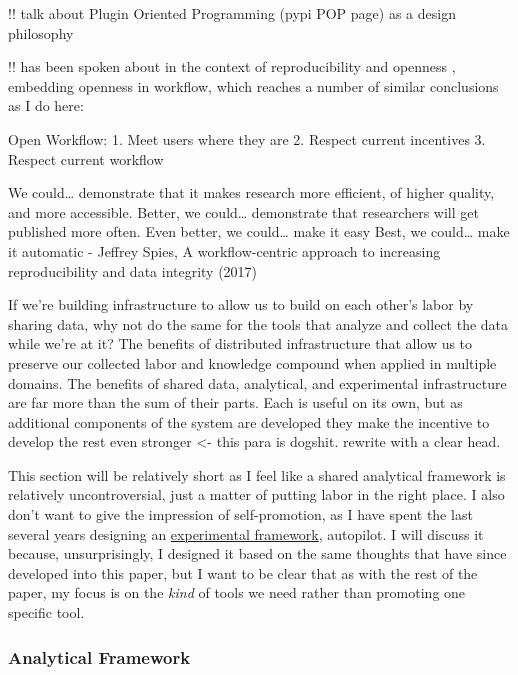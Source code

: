 \documentclass[10pt]{article}
\begin{document}
\begin{multicols}{2}
 !! talk about Plugin Oriented Programming (pypi POP page)
as a design philosophy

!! has been spoken about in the context of reproducibility and openness
\cite{spiesWorkflowCentricApproachIncreasing2017} , embedding
openness in workflow, which reaches a number of similar conclusions as I
do here:

\begin{leftbar}
Open Workflow: 1. Meet users where they are 2. Respect current
incentives 3. Respect current workflow

We could\ldots{} demonstrate that it makes research more efficient, of
higher quality, and more accessible. Better, we could\ldots{}
demonstrate that researchers will get published more often. Even better,
we could\ldots{} make it easy Best, we could\ldots{} make it automatic -
Jeffrey Spies, A workflow-centric approach to increasing reproducibility
and data integrity (2017) \cite{spiesWorkflowCentricApproachIncreasing2017} 
\end{leftbar}

If we're building infrastructure to allow us to build on each other's
labor by sharing data, why not do the same for the tools that analyze
and collect the data while we're at it? The benefits of distributed
infrastructure that allow us to preserve our collected labor and
knowledge compound when applied in multiple domains. The benefits of
shared data, analytical, and experimental infrastructure are far more
than the sum of their parts. Each is useful on its own, but as
additional components of the system are developed they make the
incentive to develop the rest even stronger \textless- this para is
dogshit. rewrite with a clear head.

This section will be relatively short as I feel like a shared analytical
framework is relatively uncontroversial, just a matter of putting labor
in the right place. I also don't want to give the impression of
self-promotion, as I have spent the last several years designing an
\href{https://docs.auto-pi-lot.com}{experimental framework}, autopilot.
I will discuss it because, unsurprisingly, I designed it based on the
same thoughts that have since developed into this paper, but I want to
be clear that as with the rest of the paper, my focus is on the
\emph{kind} of tools we need rather than promoting one specific tool.

\hypertarget{analytical-framework}{%
\subsubsection{Analytical Framework}\label{analytical-framework}}


\end{multicols}
\end{document}
